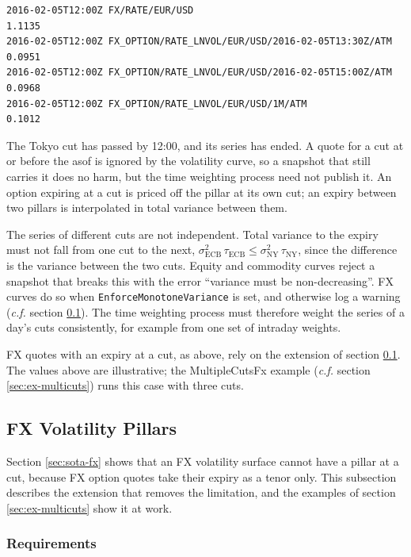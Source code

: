 \documentclass[12pt, a4paper]{article}
\begin{document}
\begin{verbatim}
2016-02-05T12:00Z FX/RATE/EUR/USD                                       1.1135
2016-02-05T12:00Z FX_OPTION/RATE_LNVOL/EUR/USD/2016-02-05T13:30Z/ATM    0.0951
2016-02-05T12:00Z FX_OPTION/RATE_LNVOL/EUR/USD/2016-02-05T15:00Z/ATM    0.0968
2016-02-05T12:00Z FX_OPTION/RATE_LNVOL/EUR/USD/1M/ATM                   0.1012
\end{verbatim}

The Tokyo cut has passed by 12:00, and its series has ended. A quote for a cut at or before the asof is ignored by the
volatility curve, so a snapshot that still carries it does no harm, but the time weighting process need not publish it. An
option expiring at a cut is priced off the pillar at its own cut; an expiry between two pillars is interpolated in total
variance between them.

The series of different cuts are not independent. Total variance to the expiry must not fall from one cut to the next,
$\sigma_{\text{ECB}}^2\,\tau_{\text{ECB}} \le \sigma_{\text{NY}}^2\,\tau_{\text{NY}}$, since the difference is the
variance between the two cuts. Equity and commodity curves reject a snapshot that breaks this with the error
``variance must be non-decreasing''. FX curves do so when \texttt{EnforceMonotoneVariance} is set, and otherwise log a
warning (\textit{c.f.} section \ref{sec:fxfix}). The time weighting process must therefore weight the series of a day's cuts consistently,
for example from one set of intraday weights.

FX quotes with an expiry at a cut, as above, rely on the extension of section \ref{sec:fxfix}. The values above are
illustrative; the MultipleCutsFx example (\textit{c.f.} section \ref{sec:ex-multicuts}) runs this case with three cuts.

\subsection{FX Volatility Pillars}\label{sec:fxfix}

Section \ref{sec:sota-fx} shows that an FX volatility surface cannot have a pillar at a cut, because FX option quotes
take their expiry as a tenor only. This subsection describes the extension that removes the limitation, and the
examples of section \ref{sec:ex-multicuts} show it at work.

\subsubsection*{Requirements}
\end{document}
